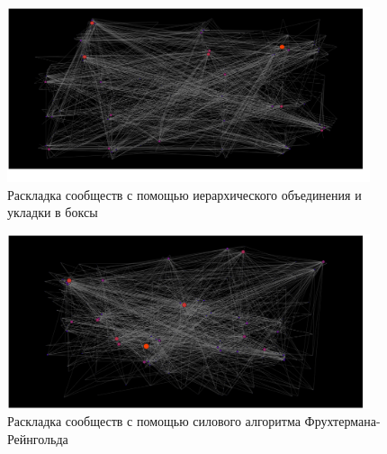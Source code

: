\begin{figure}[h!]
	\begin{center}
		\includegraphics[width=0.95\textwidth]{img/1.png}
	\end{center}
	\caption{Раскладка сообществ с помощью иерархического объединения и укладки в боксы}
	\label{img:graph1}
\end{figure}

\begin{figure}[h!]
	\begin{center}
		\includegraphics[width=0.95\textwidth]{img/2.png}
	\end{center}
	\caption{Раскладка сообществ с помощью силового алгоритма Фрухтермана-Рейнгольда}
	\label{img:graph2}
\end{figure}

